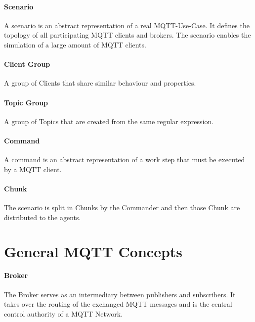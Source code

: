 \paragraph{Scenario}
A scenario is an abstract representation of a real MQTT-Use-Case.
It defines the topology of all participating MQTT clients and brokers.
The scenario enables the simulation of a large amount of MQTT clients.

\paragraph{Client Group}
A group of Clients that share similar behaviour and properties.

\paragraph{Topic Group}
A group of Topics that are created from the same regular expression.

\paragraph{Command}
A command is an abstract representation of a work step that must be executed by a MQTT client.

\paragraph{Chunk}
The scenario is split in Chunks by the Commander and then those Chunk are distributed to the agents.


\section{General MQTT Concepts}
\paragraph{Broker}
The Broker serves as an intermediary between publishers and subscribers.
It takes over the routing of the exchanged MQTT messages and is the central control authority of a MQTT Network.
